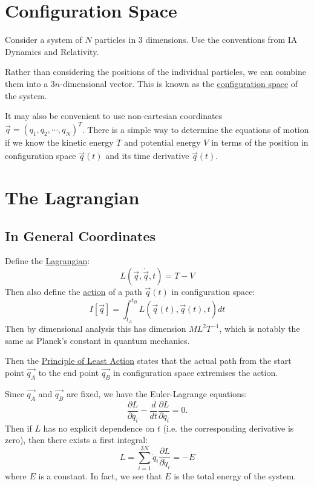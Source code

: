 \documentclass[../Main.tex]{subfiles}
\begin{document}
\section{Configuration Space}
Consider a system of $N$ particles in $3$ dimensions. Use the conventions from IA Dynamics and Relativity.

Rather than considering the positions of the individual particles, we can combine them into a $3n$-dimensional vector. This is known as the \underline{configuration space} of the system.

It may also be convenient to use non-cartesian coordinates\\$\vec{q} = (q_1, q_2, \cdots, q_N)^T$. There is a simple way to determine the equations of motion if we know the kinetic energy $T$ and potential energy $V$ in terms of the position in configuration space $\vec{q}(t)$ and its time derivative $\dot{\vec{q}}(t)$.

\section{The Lagrangian}
\subsection{In General Coordinates}
Define the \underline{Lagrangian}:
\begin{equation}
    L(\vec{q}, \dot{\vec{q}}, t) = T - V
    \label{eqnLagrangian}
\end{equation}
Then also define the \underline{action} of a path $\vec{q}(t)$ in configuration space:
\begin{equation}
    I[\vec{q}] = \int_{t_A}^{t_B} L(\vec{q}(t), \dot{\vec{q}}(t), t)dt
    \label{eqnAction}
\end{equation}
Then by dimensional analysis this has dimension $ML^2T^{-1}$, which is notably the same as Planck's constant in quantum mechanics.

Then the \underline{Principle of Least Action} states that the actual path from the start point $\vec{q_A}$ to the end point $\vec{q_B}$ in configuration space extremises the action.

Since $\vec{q_A}$ and $\vec{q_B}$ are fixed, we have the Euler-Lagrange equations:
\begin{equation*}
    \frac{\partial L}{\partial q_i} - \frac{d}{dt} \frac{\partial L}{\partial \dot{q}_i} = 0.
\end{equation*}
Then if $L$ has no explicit dependence on $t$ (i.e. the corresponding derivative is zero), then there exists a first integral:
\begin{equation*}
    L = \sum_{i = 1}^{3N} \dot{q}_i \frac{\partial L}{\partial \dot{q}_i} = -E
\end{equation*}
where $E$ is a constant. In fact, we see that $E$ is the total energy of the system.
\end{document}
